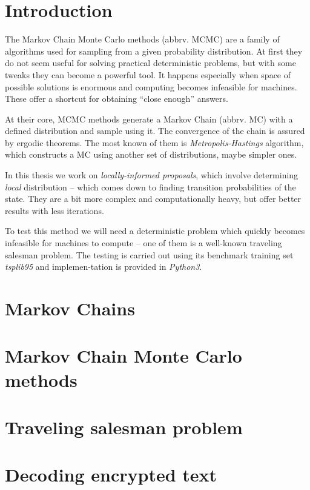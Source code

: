 \documentclass[a4paper, 12pt]{article}
\numberwithin{equation}{subsection}
\begin{document}
	\tableofcontents
	\listoftables
	\listoffigures
	\clearpage
	
	\section{Introduction}
		The Markov Chain Monte Carlo methods (abbrv. MCMC) are a family of algorithms used for sampling from a given probability distribution. At first they do not seem useful for solving practical deterministic problems, but with some tweaks they can become a powerful tool. It happens especially when space of possible solutions is enormous and computing becomes infeasible for machines. These offer a shortcut for obtaining ``close enough'' answers.
		
		At their core, MCMC methods generate a Markov Chain (abbrv. MC) with a defined distribution and sample using it. The convergence of the chain is assured by ergodic theorems. The most known of them is \textit{Metropolis-Hastings} algorithm, which constructs a MC using another set of distributions, maybe simpler ones.
		
		In this thesis we work on \textit{locally-informed proposals}, which involve determining \textit{local} distribution -- which comes down to finding transition probabilities of the state. They are a bit more complex and computationally heavy, but offer better results with less iterations. 
		
		To test this method we will need a deterministic problem which quickly becomes infeasible for machines to compute -- one of them is a well-known traveling salesman problem. The testing is carried out using its benchmark training set \textit{tsplib95} and implemen-tation is provided in \textit{Python3}.
	
	\section{Markov Chains}
	
	\section{Markov Chain Monte Carlo methods}
	
	\section{Traveling salesman problem}
	
	\section{Decoding encrypted text}
	
\end{document}
